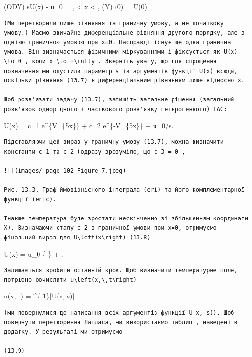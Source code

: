 \documentclass[
  ukrainian,
]{article}
\begin{document}
(ODY) \quad sU(x) - u\_0 = ,  \textless{} x
\textless{} \infty, (\Gamma Y) \quad {}(0) = U(0)

\begin{verbatim}
(Ми перетворили лише рівняння та граничну умову, а не початкову умову.) Маємо звичайне диференціальне рівняння другого порядку, але з однією граничною умовою при x=0. Насправді існує ще одна гранична умова. Він визначається фізичними міркуваннями і фіксується як U(x) \to 0 , коли x \to +\infty . Зверніть увагу, що для спрощення позначення ми опустили параметр s із аргументів функції U(x) всюди, оскільки рівняння (13.7) є диференціальним рівнянням лише відносно x.

Щоб розв'язати задачу (13.7), запишіть загальне рішення (загальний розв'язок однорідного + часткового розв'язку гетерогенного) TAC:
\end{verbatim}

U(x) = c\_1 e\^{}\{V\_\{5x\}\} + c\_2 e\^{}\{-V\_\{5x\}\} + u\_0/s.

\begin{verbatim}
Підставляючи цей вираз у граничну умову (13.7), можна визначити константи c_1 та c_2 (одразу зрозуміло, що c_3 = 0 ,

![](images/_page_102_Figure_7.jpeg)

Рис. 13.3. Граф ймовірнісного інтеграла (eri) та його комплементарної функції (eric).

Інакше температура буде зростати нескінченно зі збільшенням координати X). Визначаючи сталу c_2 з граничної умови при x=0, отримуємо фінальний вираз для U\left(x\right) (13.8)
\end{verbatim}

U(x) = u\_0 \left\{ 
\right\} + .

\begin{verbatim}
Залишається зробити останній крок. Щоб визначити температурне поле, потрібно обчислити u\left(x,\,t\right)
\end{verbatim}

u(x, t) = \^{}\{-1\}{[}U(x, s){]}

\begin{verbatim}
(ми повернулися до написання всіх аргументів функції U(x, s)). Щоб повернути перетворення Лапласа, ми використаємо таблиці, наведені в додатку. У результаті ми отримуємо

(13.9)
\end{verbatim}
\end{document}
